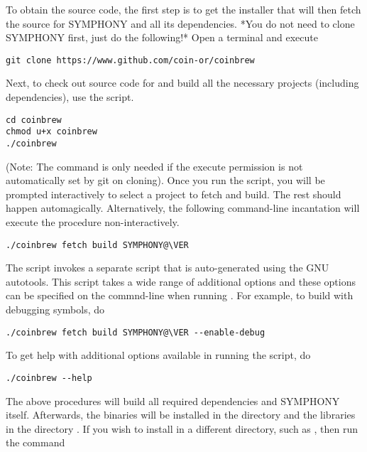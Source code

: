 To obtain the source code, the first step is to get the installer that will
then fetch the source for SYMPHONY and all its dependencies. *You do not need
to clone SYMPHONY first, just do the following!* Open a terminal and execute

{\color{brown}
\begin{verbatim}
git clone https://www.github.com/coin-or/coinbrew
\end{verbatim}
}

Next, to check out source code for and build all the necessary projects
(including dependencies), use the  script.

{\color{brown}
\begin{verbatim}
cd coinbrew
chmod u+x coinbrew
./coinbrew
\end{verbatim}
}

(Note: The  command is only needed if the execute permission is not
automatically set by git on cloning). Once you run the script,
you will be prompted interactively to select a project to fetch and build. The
rest should happen automagically. Alternatively, the following command-line
incantation will execute the procedure non-interactively.

{\color{brown}
\begin{verbatim}
./coinbrew fetch build SYMPHONY@\VER
\end{verbatim}
}

The  script invokes a separate  script that is
auto-generated using the GNU autotools. This script takes a wide range of
additional options and these options can be specified on the commnd-line when
running . For example, to build with debugging symbols,
do

{\color{brown}
\begin{verbatim}
./coinbrew fetch build SYMPHONY@\VER --enable-debug
\end{verbatim}
}

To get help with additional options available in running the script, do

{\color{brown}
\begin{verbatim}
./coinbrew --help
\end{verbatim}
}

The above procedures will build all required dependencies and SYMPHONY itself.
Afterwards, the binaries will be installed in the directory
and the libraries in the directory . If you wish to install in
a different directory, such as , then run the command

